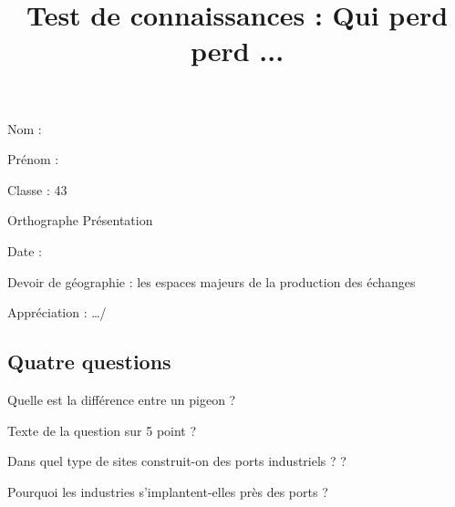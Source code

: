 \documentclass[a4paper,12pt]{exam}
\title{Test de connaissances : \color{color2}Qui perd perd ...}
\date{}
\newcommand{\rep}[1]{}
\newcommand{\rep}[1]{\fillwithdottedlines{#1}}
\begin{document}
\begin{minipage}{4cm}
  Nom :
  
  Prénom :
  
  Classe : 43
\end{minipage}
\hfill
\begin{minipage}{3cm}

{\small    \begin{questions} \question[1] Orthographe
\question[1] Présentation \end{questions}
}
Date : 
\end{minipage}


\vspace{1cm}

\begin{center}

{\Large Devoir de géographie : les espaces majeurs de la production des échanges}

\vspace{0.5cm}
  \end{center}
Appréciation : \hfill  {\large  …/\numpoints\ } %


\vspace{2cm}



 
\begin{questions} %
\section*{Quatre questions}
 
 
\question[5] Quelle est la différence entre un pigeon ?
\rep{2cm}
 
\question[5] Texte de la question sur 5 point ?
\rep{2cm}
 
\question[4] Dans quel type de sites construit-on des ports industriels ? ?
\rep{2cm}
 
     
\question[4] Pourquoi les industries s'implantent-elles près des ports ?
\answerline
 
  \end{questions}
\end{document}
